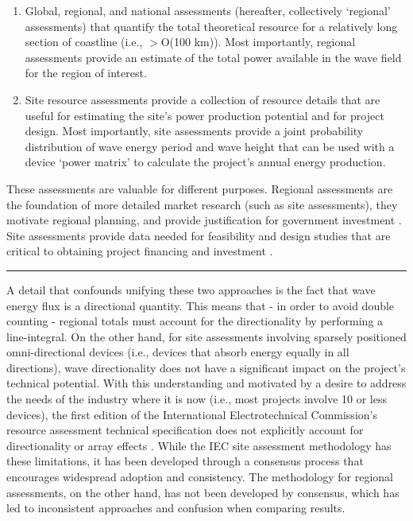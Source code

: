 \begin{enumerate}
\item Global, regional, and national assessments (hereafter, collectively ‘regional’ assessments) that quantify the total theoretical resource for a relatively long section of coastline (i.e., $>$O(100 km)). Most importantly, regional assessments provide an estimate of the total power available in the wave field for the region of interest.
\item Site resource assessments provide a collection of resource details that are useful for estimating the site’s power production potential and for project design. Most importantly, site assessments provide a joint probability distribution of wave energy period and wave height that can be used with a device ‘power matrix’ to calculate the project’s annual energy production.
\end{enumerate}

These assessments are valuable for different purposes. Regional assessments are the foundation of more detailed market research (such as site assessments), they motivate regional planning, and provide justification for government investment \citep[e.g., ][]{EPRIwaveresource2011,gunnQuantifyingGlobalWave2012,regueroGlobalWavePower2015,motaWaveEnergyPotential2014}. Site assessments provide data needed for feasibility and design studies that are critical to obtaining project financing and investment \citep[]{robertsonCharacterizingShoreWave2014,iglesiasWaveEnergyPotential2009}.

\noindent\rule{12cm}{0.4pt}

A detail that confounds unifying these two approaches is the fact that wave energy flux is a directional quantity. This means that - in order to avoid double counting - regional totals must account for the directionality by performing a line-integral. On the other hand, for site assessments involving sparsely positioned omni-directional devices (i.e., devices that absorb energy equally in all directions), wave directionality does not have a significant impact on the project’s technical potential. With this understanding and motivated by a desire to address the needs of the industry where it is now (i.e., most projects involve 10 or less devices), the first edition of the International Electrotechnical Commission’s resource assessment technical specification does not explicitly account for directionality or array effects \citep[]{internationalelectrotechnicalcommissionPart101Wave2015}. While the IEC site assessment methodology has these limitations, it has been developed through a consensus process that encourages widespread adoption and consistency. The methodology for regional assessments, on the other hand, has not been developed by consensus, which has led to inconsistent approaches and confusion when comparing results.

